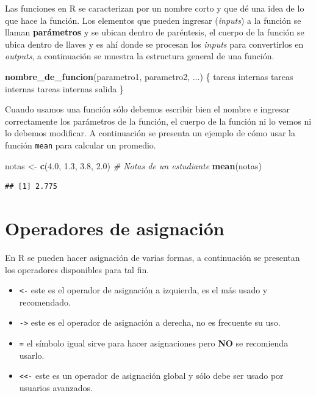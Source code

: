 \documentclass[10pt,]{krantz}
\makeatletter
\newenvironment{Shaded}{\begin{snugshade}}{\end{snugshade}}
\newcommand{\KeywordTok}[1]{\textcolor[rgb]{0.13,0.29,0.53}{\textbf{#1}}}
\newcommand{\FloatTok}[1]{\textcolor[rgb]{0.00,0.00,0.81}{#1}}
\newcommand{\StringTok}[1]{\textcolor[rgb]{0.31,0.60,0.02}{#1}}
\newcommand{\CommentTok}[1]{\textcolor[rgb]{0.56,0.35,0.01}{\textit{#1}}}
\newcommand{\NormalTok}[1]{#1}
\providecommand{\tightlist}{%
  \setlength{\itemsep}{0pt}\setlength{\parskip}{0pt}}
\newenvironment{kframe}{%
\medskip{}
\setlength{\fboxsep}{.8em}
 \def\at@end@of@kframe{}%
 \ifinner\ifhmode%
  \def\at@end@of@kframe{\end{minipage}}%
  \begin{minipage}{\columnwidth}%
 \fi\fi%
 \def\FrameCommand##1{\hskip\@totalleftmargin \hskip-\fboxsep
 \colorbox{shadecolor}{##1}\hskip-\fboxsep
     \hskip-\linewidth \hskip-\@totalleftmargin \hskip\columnwidth}%
 \MakeFramed {\advance\hsize-\width
   \@totalleftmargin\z@ \linewidth\hsize
   \@setminipage}}%
 {\par\unskip\endMakeFramed%
 \at@end@of@kframe}
\renewenvironment{Shaded}{\begin{kframe}}{\end{kframe}}
\makeatother
\begin{document}
Las funciones en R se caracterizan por un nombre corto y que dé una idea
de lo que hace la función. Los elementos que pueden ingresar
(\emph{inputs}) a la función se llaman \textbf{parámetros} y se ubican
dentro de paréntesis, el cuerpo de la función se ubica dentro de llaves
y es ahí donde se procesan los \emph{inputs} para convertirlos en
\emph{outputs}, a continuación se muestra la estructura general de una
función.

\begin{Shaded}
\begin{Highlighting}[]
\KeywordTok{nombre_de_funcion}\NormalTok{(parametro1, parametro2, ...) \{}
\NormalTok{  tareas internas}
\NormalTok{  tareas internas}
\NormalTok{  tareas internas}
\NormalTok{  salida}
\NormalTok{\}}
\end{Highlighting}
\end{Shaded}

Cuando usamos una función sólo debemos escribir bien el nombre e
ingresar correctamente los parámetros de la función, el cuerpo de la
función ni lo vemos ni lo debemos modificar. A continuación se presenta
un ejemplo de cómo usar la función \texttt{mean} para calcular un
promedio.

\begin{Shaded}
\begin{Highlighting}[]
\NormalTok{notas <-}\StringTok{ }\KeywordTok{c}\NormalTok{(}\FloatTok{4.0}\NormalTok{, }\FloatTok{1.3}\NormalTok{, }\FloatTok{3.8}\NormalTok{, }\FloatTok{2.0}\NormalTok{)  }\CommentTok{# Notas de un estudiante}
\KeywordTok{mean}\NormalTok{(notas)}
\end{Highlighting}
\end{Shaded}

\begin{verbatim}
## [1] 2.775
\end{verbatim}

\section{\texorpdfstring{Operadores de asignación
}{Operadores de asignación }}\label{operadores-de-asignacion}

En R se pueden hacer asignación de varias formas, a continuación se
presentan los operadores disponibles para tal fin.

\begin{itemize}
\tightlist
\item
  \texttt{\textless{}-} este es el operador de asignación a izquierda,
  es el más usado y recomendado.
\item
  \texttt{-\textgreater{}} este es el operador de asignación a derecha,
  no es frecuente su uso.
\item
  \texttt{=} el símbolo igual sirve para hacer asignaciones pero
  \textbf{NO} se recomienda usarlo.
\item
  \texttt{\textless{}\textless{}-} este es un operador de asignación
  global y sólo debe ser usado por usuarios avanzados.
\end{itemize}
\end{document}
